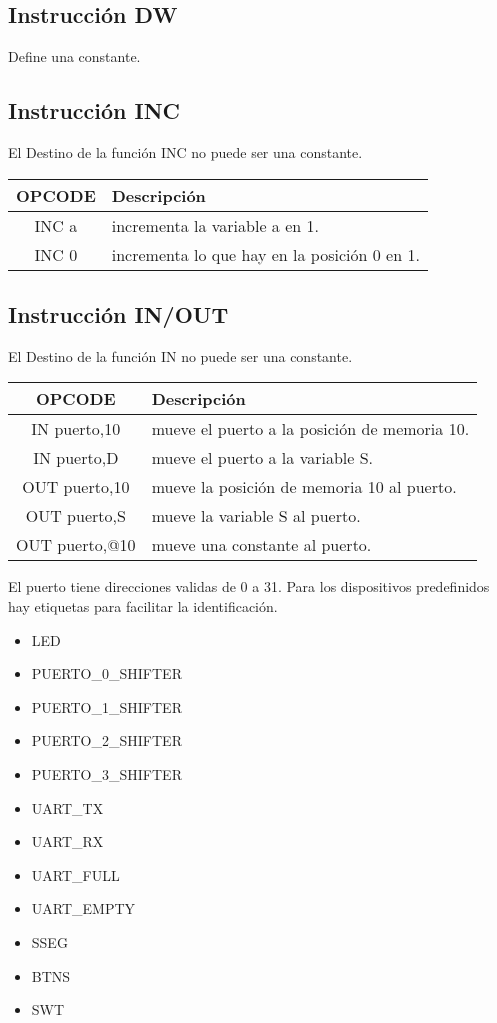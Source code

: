 \documentclass[12pt]{article}
\begin{document}
\subsection{Instrucci\'on DW }
Define una constante.

\subsection{Instrucci\'on INC }
El Destino de la funci\'on INC no puede ser una constante.\\
\begin{tabular}{| c | p{11.5cm}|}
\hline 
OPCODE & Descripci\'on  \\ \hline
INC a & incrementa la variable a en 1.\\ \hline
INC 0 & incrementa lo que hay en la posici\'on 0 en 1.\\ \hline
\end{tabular}

\subsection{Instrucci\'on IN/OUT }
El Destino de la funci\'on IN no puede ser una constante.

\begin{tabular}{| c | p{11.5cm}|}
\hline 
OPCODE & Descripci\'on  \\ \hline
IN puerto,10 & mueve el puerto a la posici\'on de memoria 10.\\ \hline
IN puerto,D  & mueve el puerto a la variable S.\\ \hline
OUT puerto,10 & mueve la posici\'on de memoria 10 al puerto.\\ \hline
OUT puerto,S  & mueve la variable S al puerto.\\ \hline
OUT puerto,@10  & mueve una constante al puerto.\\ \hline
\end{tabular}

El puerto tiene direcciones validas de 0 a 31. Para los dispositivos predefinidos hay etiquetas para facilitar la identificaci\'on.
\begin{itemize}
    \item LED
    \item PUERTO\_0\_SHIFTER
    \item PUERTO\_1\_SHIFTER
    \item PUERTO\_2\_SHIFTER
    \item PUERTO\_3\_SHIFTER
    \item UART\_TX
    \item UART\_RX
    \item UART\_FULL
    \item UART\_EMPTY
    \item SSEG
    \item BTNS
    \item SWT
\end{itemize}
\end{document}
